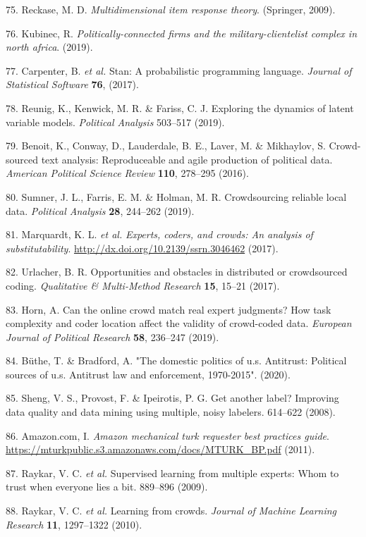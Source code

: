 \documentclass[
]{article}
\newenvironment{cslreferences}%
  {}%
  {\par}
\begin{document}
\begin{cslreferences}
\leavevmode\hypertarget{ref-reckase2009}{}%
75. Reckase, M. D. \emph{Multidimensional item response theory}. (Springer, 2009).

\leavevmode\hypertarget{ref-kubinec2019}{}%
76. Kubinec, R. \emph{Politically-connected firms and the military-clientelist complex in north africa}. (2019).

\leavevmode\hypertarget{ref-carpenter2017}{}%
77. Carpenter, B. \emph{et al.} Stan: A probabilistic programming language. \emph{Journal of Statistical Software} \textbf{76}, (2017).

\leavevmode\hypertarget{ref-reunig2019}{}%
78. Reunig, K., Kenwick, M. R. \& Fariss, C. J. Exploring the dynamics of latent variable models. \emph{Political Analysis} 503--517 (2019).

\leavevmode\hypertarget{ref-benoitetal2016}{}%
79. Benoit, K., Conway, D., Lauderdale, B. E., Laver, M. \& Mikhaylov, S. Crowd-sourced text analysis: Reproduceable and agile production of political data. \emph{American Political Science Review} \textbf{110}, 278--295 (2016).

\leavevmode\hypertarget{ref-sumneretal2019}{}%
80. Sumner, J. L., Farris, E. M. \& Holman, M. R. Crowdsourcing reliable local data. \emph{Political Analysis} \textbf{28}, 244--262 (2019).

\leavevmode\hypertarget{ref-marquardtetal2017}{}%
81. Marquardt, K. L. \emph{et al.} \emph{Experts, coders, and crowds: An analysis of substitutability}. \url{http://dx.doi.org/10.2139/ssrn.3046462} (2017).

\leavevmode\hypertarget{ref-Urlacher2017}{}%
82. Urlacher, B. R. Opportunities and obstacles in distributed or crowdsourced coding. \emph{Qualitative \& Multi-Method Research} \textbf{15}, 15--21 (2017).

\leavevmode\hypertarget{ref-Horn2019}{}%
83. Horn, A. Can the online crowd match real expert judgments? How task complexity and coder location affect the validity of crowd-coded data. \emph{European Journal of Political Research} \textbf{58}, 236--247 (2019).

\leavevmode\hypertarget{ref-buthe2020}{}%
84. Büthe, T. \& Bradford, A. "The domestic politics of u.s. Antitrust: Political sources of u.s. Antitrust law and enforcement, 1970-2015". (2020).

\leavevmode\hypertarget{ref-Sheng2008}{}%
85. Sheng, V. S., Provost, F. \& Ipeirotis, P. G. Get another label? Improving data quality and data mining using multiple, noisy labelers. 614--622 (2008).

\leavevmode\hypertarget{ref-MTurk2011}{}%
86. Amazon.com, I. \emph{Amazon mechanical turk requester best practices guide}. \url{https://mturkpublic.s3.amazonaws.com/docs/MTURK_BP.pdf} (2011).

\leavevmode\hypertarget{ref-Raykar2009}{}%
87. Raykar, V. C. \emph{et al.} Supervised learning from multiple experts: Whom to trust when everyone lies a bit. 889--896 (2009).

\leavevmode\hypertarget{ref-Raykar2010}{}%
88. Raykar, V. C. \emph{et al.} Learning from crowds. \emph{Journal of Machine Learning Research} \textbf{11}, 1297--1322 (2010).
\end{cslreferences}
\end{document}
